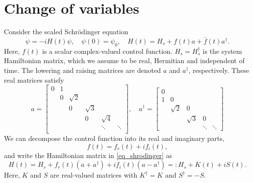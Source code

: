\documentclass[11pt]{article}
\begin{document}



\section{Change of variables}
Consider the scaled Schr\"odinger equation
\begin{equation}\label{eq_shrodinger}
\dot{\psi} = -i H(t) \psi,\quad \psi(0) = \psi_0,\quad H(t) = H_s + f(t)a + \bar{f}(t)a^\dag.
\end{equation}
Here, $f(t)$ is a scalar complex-valued control function. $H_s = H_s^\dag$ is the system Hamiltonian matrix, which we assume to be real, Hermitian and
independent of time. The lowering and raising matrices are denoted $a$ and $a^\dag$,
respectively. These real matrices satisfy
\begin{equation}\label{eq_matrices}
%
a = \begin{bmatrix}
0 & 1 & & & &\\
 & 0 & \sqrt{2} & & &\\
&  & 0 & \sqrt{3} & &\\
& &  & 0 & \sqrt{4} & \\
& &  &  & \ddots & \ddots\\
\end{bmatrix},\quad
%
a^\dag = \begin{bmatrix}
0 &  & & &\\
1 & 0 & & &\\
&  \sqrt{2} & 0 &  &\\
& &  \sqrt{3} & 0 & \\
& &  & \ddots & \ddots
\end{bmatrix}
\end{equation}
We can decompose the control function into its real and imaginary parts,
\[
f(t) = f_r(t) + i f_i(t),
\]
and write the Hamiltonian matrix in \eqref{eq_shrodinger} as
\[
H(t) = H_s + f_r(t)\left( a+ a^\dag\right) + i f_i(t)\left( a - a^\dag\right) =: H_s + K(t) + i S(t).
\]
Here, $K$ and $S$ are real-valued matrices with $K^\dag = K$ and $S^\dag = -S$.
\end{document}
